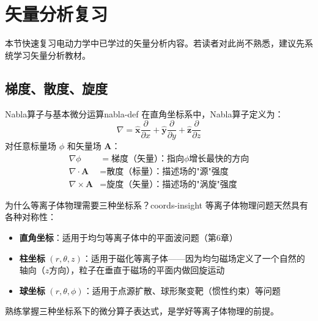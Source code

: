 \documentclass[12pt,a4paper,openany,oneside]{book}
\newcommand{\vect}[1]{\bm{#1}}
\newcommand{\unitvec}[1]{\hat{\vect{#1}}}
\newcommand{\grad}{\nabla}
\newcommand{\curl}{\nabla\times}
\newcommand{\divg}{\nabla\cdot}
\newcommand{\difficulty}[1]{\marginnote{\hfill\textcolor{coverMid!80}{\rule[-0.1em]{2pt}{0.9em}}\,\textcolor{coverMid}{\footnotesize\textbf{[#1]}}}}
\begin{document}
\section{矢量分析复习}\difficulty{基础}

本节快速复习电动力学中已学过的矢量分析内容。若读者对此尚不熟悉，建议先系统学习矢量分析教材。

\subsection{梯度、散度、旋度}

\begin{definition}{Nabla算子与基本微分运算}{nabla-def}
在直角坐标系中，Nabla算子定义为：
\[
\grad = \unitvec{x}\frac{\partial}{\partial x} + \unitvec{y}\frac{\partial}{\partial y} + \unitvec{z}\frac{\partial}{\partial z}
\]
对任意标量场 $\phi$ 和矢量场 $\vect{A}$：
\begin{align*}
\grad\phi &= \text{梯度（矢量）：指向}\phi\text{增长最快的方向} \\
\divg\vect{A} &= \text{散度（标量）：描述场的"源"强度} \\
\curl\vect{A} &= \text{旋度（矢量）：描述场的"涡旋"强度}
\end{align*}
\end{definition}

\begin{insight}{为什么等离子体物理需要三种坐标系？}{coords-insight}
等离子体物理问题天然具有各种对称性：
\begin{itemize}
\item \textbf{直角坐标}：适用于均匀等离子体中的平面波问题（第6章）
\item \textbf{柱坐标} $(r,\theta,z)$：适用于磁化等离子体——因为均匀磁场定义了一个自然的轴向（$z$方向），粒子在垂直于磁场的平面内做回旋运动
\item \textbf{球坐标} $(r,\theta,\phi)$：适用于点源扩散、球形聚变靶（惯性约束）等问题
\end{itemize}
熟练掌握三种坐标系下的微分算子表达式，是学好等离子体物理的前提。
\end{insight}
\end{document}
